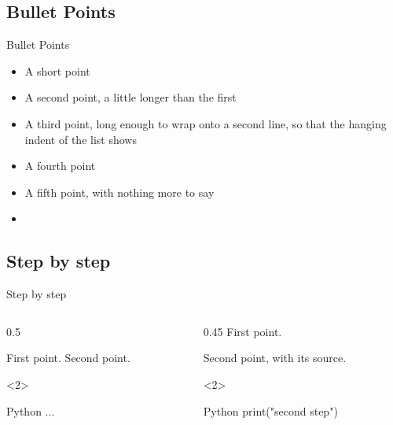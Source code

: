 \subsection{Bullet Points}
\begin{frame}{Bullet Points}
    \begin{itemize}
        \item A short point
        \item A second point, a little longer than the first
        \item A third point, long enough to wrap onto a second line, so that the hanging indent of the list shows
        \item A fourth point
        \item A fifth point, with nothing more to say
        \item {}
    \end{itemize}
\end{frame}

\subsection{Step by step}
\begin{frame}[c]{Step by step}
\begin{columns}[T,onlytextwidth]
\begin{column}{0.5\textwidth}
\begin{codeonly}
First point.
\pause
Second point.
\end{codeonly}
\smallskip
{}
\begin{codeonly}
\begin{onlyenv}<2>
  \begin{codeblock}{Python}
  ...
  \end{codeblock}
\end{onlyenv}
\end{codeonly}
\end{column}
\begin{column}{0.45\textwidth}
\stepoffset
First point.
\pause

Second point, with its source.
\begin{onlyenv}<2>
\begin{codeblock}{Python}
print("second step")
\end{codeblock}
\end{onlyenv}
\end{column}
\end{columns}
\end{frame}

